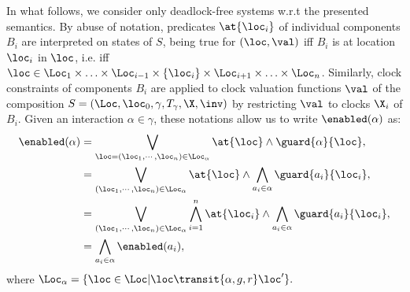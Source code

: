 In what follows, we consider only deadlock-free systems w.r.t the presented semantics.
By abuse of notation, predicates $\at{\loc_i}$ of individual components $B_i$ are interpreted on states of $S$,
being true for $(\loc,\val)$ iff $B_i$ is at location $\loc_i$ in $\loc$, i.e. iff $\loc\in
\Loc_1\times\ldots\times\Loc_{i-1}\times\{\loc_i\}\times\Loc_{i+1}\times\ldots\times\Loc_n$.
Similarly, clock constraints of components $B_i$ are applied to clock valuation functions $\val$ 
of the composition $S= (\Loc,\loc_0,\gamma,T_{\gamma},\X,\inv)$ by restricting $\val$ to clocks $\X_i$ of $B_i$.
Given an interaction $\alpha\in\gamma$, these notations allow us to write $\enabled(\alpha)$ as:
\begin{align*}
  \enabled(\alpha) &= \bigvee_{\loc=(\loc_1,\cdots,\loc_n)\in\Loc_{\alpha}} \at{\loc}\wedge \guard{\alpha}{\loc},\\
                   &= \bigvee_{(\loc_1,\cdots,\loc_n)\in\Loc_{\alpha}} \at{\loc}\wedge \bigwedge_{a_i\in\alpha}\guard{a_i}{\loc_i},\\
                   &= \bigvee_{(\loc_1,\cdots,\loc_n)\in\Loc_{\alpha}} \bigwedge_{i=1}^n\at{\loc_i}\wedge \bigwedge_{a_i\in\alpha}\guard{a_i}{\loc_i},\\
                   &= \bigwedge_{a_i\in\alpha} \enabled(a_i),
\end{align*}
where $\Loc_{\alpha}=\{\loc\in\Loc|\loc\transit{\alpha,g,r}\loc'\}.$

